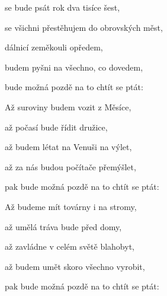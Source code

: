 

\zs
{} se bude psát rok dva tisíce šest,

 se všichni přestěhujem do obrovských měst,

 dálnicí zeměkouli opředem,

 budem pyšni na všechno, co dovedem,

 bude možná pozdě na to chtít se ptát:

\ks

\zs
Až suroviny budem vozit z Měsíce,

až počasí bude řídit družice,

až budem létat na Venuši na výlet,

až za nás budou počítače přemýšlet,

pak bude možná pozdě na to chtít se ptát:

\ks

\zs
Až budeme mít továrny i na stromy,

až umělá tráva bude před domy,

až zavládne v celém světě blahobyt,

až budem umět skoro všechno vyrobit,

pak bude možná pozdě na to chtít se ptát:

\ks

\kp






















